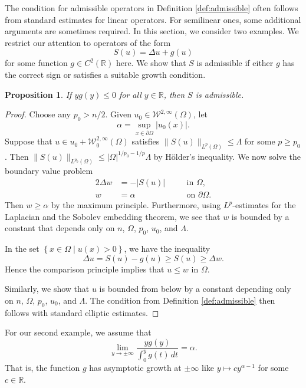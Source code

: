 \documentclass[a4paper]{article}
\newcommand{\R}{\mathbb{R}}
\newcommand{\W}{\mathcal{W}}
\newcommand{\set}[2]{\left\{ #1 \mid #2 \right\}}
\newtheorem{proposition}[theorem]{Proposition}
\theoremstyle{remark}
\begin{document}
The condition for admissible operators in Definition \ref{def:admissible} often follows from standard estimates
for linear operators. For semilinear ones, some additional arguments are sometimes required.
In this section, we consider two examples. We restrict our attention to operators
of the form
\[
S(u) = \Delta u + g(u)
\]
for some function $g \in C^2(\R)$ here. We show that $S$ is admissible if
either $g$ has the correct sign or satisfies a suitable growth condition.

\begin{proposition}
If $y g(y) \le 0$ for all $y \in \R$, then $S$ is admissible.
\end{proposition}

\begin{proof}
Choose any $p_0 > n/2$. Given $u_0 \in \W^{2, \infty}(\Omega)$, let
\[
\alpha = \sup_{x \in \partial \Omega} |u_0(x)|.
\]
Suppose that $u \in u_0 + \W_0^{2, \infty}(\Omega)$ satisfies
$\|S(u)\|_{L^p(\Omega)} \le \Lambda$ for some $p \ge p_0$. Then
$\|S(u)\|_{L^{p_0}(\Omega)} \le |\Omega|^{1/p_0 -1/p} \Lambda$ by
H\"older's inequality.
We now solve the boundary value problem
\begin{alignat*}{2}
\Delta w & = -|S(u)| & \quad & \text{in $\Omega$}, \\
w & = \alpha && \text{on $\partial \Omega$}.
\end{alignat*}
Then $w \ge \alpha$ by the maximum principle. Furthermore, using $L^p$-estimates
for the Laplacian and the Sobolev embedding theorem, we see that $w$ is bounded by
a constant that depends only on $n$, $\Omega$, $p_0$, $u_0$, and $\Lambda$.

In the set
$\set{x \in \Omega}{u(x) > 0}$, we have the inequality
\[
\Delta u = S(u) - g(u) \ge S(u) \ge \Delta w.
\] 
Hence
the comparison principle implies that $u \le w$ in $\Omega$.

Similarly, we show that $u$ is bounded from below by a constant depending only on $n$, $\Omega$, $p_0$, $u_0$, and $\Lambda$.
The condition from Definition \ref{def:admissible} then follows with standard elliptic estimates.
\end{proof}

For our second example, we assume that
\begin{equation} \label{eq:growth-implicit}
\lim_{y \to \pm \infty} \frac{yg(y)}{\int_0^y g(t) \, dt} = \alpha.
\end{equation}
That is, the function $g$ has asymptotic growth at $\pm \infty$ like $y \mapsto cy^{\alpha - 1}$ for some $c \in \R$.
\end{document}
